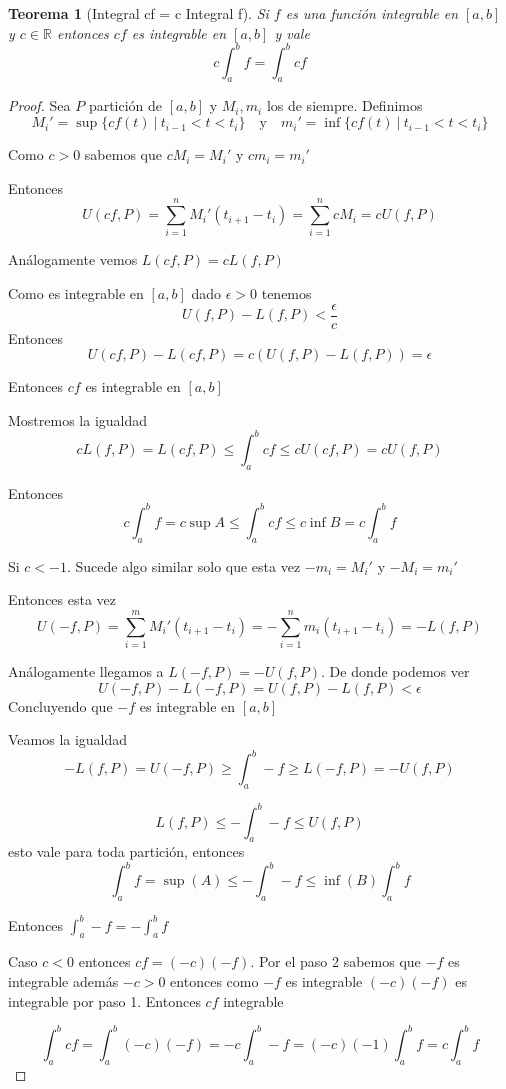 \documentclass{article}
\theoremstyle{break}
\newtheorem{theorem}{Teorema}[section]
\begin{document}
\begin{theorem}[Integral cf = c Integral f]
	Si $f$ es una función integrable en $[a,b]$ y $c\in \mathbb{R}$ entonces $cf$ es integrable
	en $[a,b]$ y vale
	\[ c \int_{a}^{b} f = \int_{a}^{b} cf \]
\end{theorem}
\begin{proof}
	Sea $P$ partición de $[a,b]$ y $M_i,m_i$ los de siempre. Definimos
	\[ M_i' = \sup \{cf(t) \ | \ t_{i-1}<t<t_i\} \quad \text{y} \quad m_i' 
	= \inf \{cf(t) \ | \ t_{i-1}<t<t_i\} \]

	Como $c>0$ sabemos que $cM_i = M_i'$ y $cm_i = m_i'$

	Entonces \[ U(cf,P) = \sum_{i=1}^{n} M_i' (t_{i+1}-t_i)=\sum_{i=1}^{n} cM_i = c U(f,P) \]

	Análogamente vemos $L(cf,P) = cL(f,P)$

	Como es integrable en $[a,b]$ dado $\epsilon > 0$ tenemos 
	\[ U(f,P)-L(f,P) < \frac{\epsilon}{c}\] 
	Entonces 
	\[ U(cf,P) - L(cf,P) = c(U(f,P)-L(f,P)) = \epsilon \]

	Entonces $cf$ es integrable en $[a,b]$

	Mostremos la igualdad 
	\[ cL(f,P) = L(cf,P) \leq \int_{a}^{b} cf \leq c U(cf,P) =c U(f,P)\]

	Entonces \[ c\int_{a}^{b} f=c \sup A \leq \int_{a}^{b} cf \leq c\inf B = c \int_{a}^{b} f \]

	Si $c < -1$. Sucede algo similar solo que esta vez $-m_i=M_i'$ y $-M_i=m_i'$

	Entonces esta vez \[ U(-f,P) = \sum_{i=1}^{m} M_i' (t_{i+1}-t_{i}) =
	 - \sum_{i=1}^{n} m_i(t_{i+1}-t_i)=- L(f,P) \]

	Análogamente llegamos a $L(-f,P) = - U(f,P)$. De donde podemos ver
	\[ U(-f,P) - L(-f,P) = U(f,P) - L(f,P) < \epsilon \]
	Concluyendo que $-f$ es integrable en $[a,b]$

	Veamos la igualdad
	\[ -L(f,P) = U(-f,P) \geq \int_{a}^{b} -f \geq L(-f,P) = - U(f,P) \]

	\[ L(f,P) \leq - \int_{a}^{b} -f \leq  U(f,P) \]
	esto vale para toda partición, entonces
	\[ \int_{a}^{b} f=\sup(A) \leq - \int_{a}^{b} -f \leq \inf(B) \int_{a}^{b} f\]

	Entonces $\int_{a}^{b} -f = -\int_{a}^{b} f$

	Caso $c<0$ entonces $cf=(-c)(-f)$. Por el paso 2 sabemos que $-f$ es integrable
	además $-c > 0$ entonces como $-f$ es integrable $(-c)(-f)$ es integrable por paso 1.
	Entonces $cf$ integrable

	\[ \int_{a}^{b} cf = \int_{a}^{b} (-c)(-f) = -c \int_{a}^{b} -f = 
	(-c)(-1)\int_{a}^{b} f = c\int_{a}^{b} f \]
\end{proof}
\end{document}
